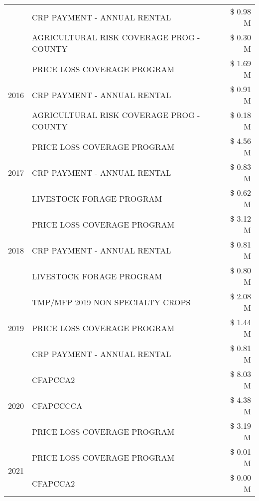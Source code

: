 \begin{tabular}{llr}
 & CRP PAYMENT - ANNUAL RENTAL & \$ 0.98 M \\
 & AGRICULTURAL RISK COVERAGE PROG - COUNTY & \$ 0.30 M \\
\cline{1-3}
\multirow[t]{3}{*}{2016} & PRICE LOSS COVERAGE PROGRAM & \$ 1.69 M \\
 & CRP PAYMENT - ANNUAL RENTAL & \$ 0.91 M \\
 & AGRICULTURAL RISK COVERAGE PROG - COUNTY & \$ 0.18 M \\
\cline{1-3}
\multirow[t]{3}{*}{2017} & PRICE LOSS COVERAGE PROGRAM & \$ 4.56 M \\
 & CRP PAYMENT - ANNUAL RENTAL & \$ 0.83 M \\
 & LIVESTOCK FORAGE PROGRAM & \$ 0.62 M \\
\cline{1-3}
\multirow[t]{3}{*}{2018} & PRICE LOSS COVERAGE PROGRAM & \$ 3.12 M \\
 & CRP PAYMENT - ANNUAL RENTAL & \$ 0.81 M \\
 & LIVESTOCK FORAGE PROGRAM & \$ 0.80 M \\
\cline{1-3}
\multirow[t]{3}{*}{2019} & TMP/MFP 2019 NON SPECIALTY CROPS & \$ 2.08 M \\
 & PRICE LOSS COVERAGE PROGRAM & \$ 1.44 M \\
 & CRP PAYMENT - ANNUAL RENTAL & \$ 0.81 M \\
\cline{1-3}
\multirow[t]{3}{*}{2020} & CFAPCCA2 & \$ 8.03 M \\
 & CFAPCCCCA & \$ 4.38 M \\
 & PRICE LOSS COVERAGE PROGRAM & \$ 3.19 M \\
\cline{1-3}
\multirow[t]{2}{*}{2021} & PRICE LOSS COVERAGE PROGRAM & \$ 0.01 M \\
 & CFAPCCA2 & \$ 0.00 M \\
\cline{1-3}
\bottomrule
\end{tabular}
